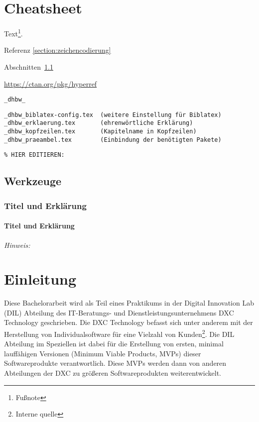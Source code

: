 \chapter{Cheatsheet}

Text\footnote{Fußnote}.

Referenz \ref{section:zeichencodierung}

Abschnitten~\ref{section:werkzeuge}

\url{https://ctan.org/pkg/hyperref}

\verb|_dhbw_|

\begin{verbatim}
_dhbw_biblatex-config.tex  (weitere Einstellung für Biblatex)
_dhbw_erklaerung.tex       (ehrenwörtliche Erklärung)
_dhbw_kopfzeilen.tex       (Kapitelname in Kopfzeilen) 
_dhbw_praeambel.tex        (Einbindung der benötigten Pakete)
\end{verbatim}

\lstset{language=TeX} 
\begin{lstlisting}
% HIER EDITIEREN: 
\end{lstlisting}

\section{Werkzeuge}\label{section:werkzeuge}

\subsection{Titel und Erklärung}

\subsubsection{Titel und Erklärung}

\emph{Hinweis:}


\chapter{Einleitung}\label{einleitung}

Diese Bachelorarbeit wird als Teil eines Praktikums in der Digital
Innovation Lab (DIL) Abteilung des IT-Beratungs- und
Dienstleistungsunternehmens DXC Technology geschrieben. Die DXC
Technology befasst sich unter anderem mit der Herstellung von
Individualsoftware für eine Vielzahl von Kunden\footnote{Interne quelle}.
Die DIL Abteilung im Speziellen ist dabei für die Erstellung von ersten,
minimal lauffähigen Versionen (Minimum Viable Products, MVPs) dieser
Softwareprodukte verantwortlich. Diese MVPs werden dann von anderen
Abteilungen der DXC zu größeren Softwareprodukten weiterentwickelt.

